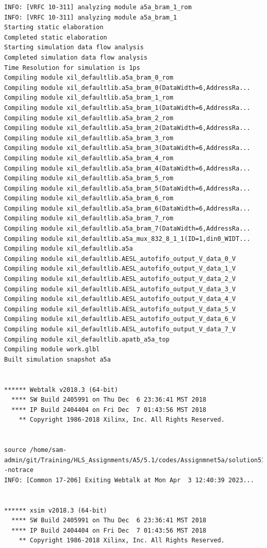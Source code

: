 \documentclass{article}
\begin{document}
\begin{lstlisting}
INFO: [VRFC 10-311] analyzing module a5a_bram_1_rom
INFO: [VRFC 10-311] analyzing module a5a_bram_1
Starting static elaboration
Completed static elaboration
Starting simulation data flow analysis
Completed simulation data flow analysis
Time Resolution for simulation is 1ps
Compiling module xil_defaultlib.a5a_bram_0_rom
Compiling module xil_defaultlib.a5a_bram_0(DataWidth=6,AddressRa...
Compiling module xil_defaultlib.a5a_bram_1_rom
Compiling module xil_defaultlib.a5a_bram_1(DataWidth=6,AddressRa...
Compiling module xil_defaultlib.a5a_bram_2_rom
Compiling module xil_defaultlib.a5a_bram_2(DataWidth=6,AddressRa...
Compiling module xil_defaultlib.a5a_bram_3_rom
Compiling module xil_defaultlib.a5a_bram_3(DataWidth=6,AddressRa...
Compiling module xil_defaultlib.a5a_bram_4_rom
Compiling module xil_defaultlib.a5a_bram_4(DataWidth=6,AddressRa...
Compiling module xil_defaultlib.a5a_bram_5_rom
Compiling module xil_defaultlib.a5a_bram_5(DataWidth=6,AddressRa...
Compiling module xil_defaultlib.a5a_bram_6_rom
Compiling module xil_defaultlib.a5a_bram_6(DataWidth=6,AddressRa...
Compiling module xil_defaultlib.a5a_bram_7_rom
Compiling module xil_defaultlib.a5a_bram_7(DataWidth=6,AddressRa...
Compiling module xil_defaultlib.a5a_mux_832_8_1_1(ID=1,din0_WIDT...
Compiling module xil_defaultlib.a5a
Compiling module xil_defaultlib.AESL_autofifo_output_V_data_0_V
Compiling module xil_defaultlib.AESL_autofifo_output_V_data_1_V
Compiling module xil_defaultlib.AESL_autofifo_output_V_data_2_V
Compiling module xil_defaultlib.AESL_autofifo_output_V_data_3_V
Compiling module xil_defaultlib.AESL_autofifo_output_V_data_4_V
Compiling module xil_defaultlib.AESL_autofifo_output_V_data_5_V
Compiling module xil_defaultlib.AESL_autofifo_output_V_data_6_V
Compiling module xil_defaultlib.AESL_autofifo_output_V_data_7_V
Compiling module xil_defaultlib.apatb_a5a_top
Compiling module work.glbl
Built simulation snapshot a5a


****** Webtalk v2018.3 (64-bit)
  **** SW Build 2405991 on Thu Dec  6 23:36:41 MST 2018
  **** IP Build 2404404 on Fri Dec  7 01:43:56 MST 2018
    ** Copyright 1986-2018 Xilinx, Inc. All Rights Reserved.


source /home/sam-admin/git/Training/HLS_Assignments/A5/5.1/codes/Assignmnet5a/solution51a/sim/verilog/xsim.dir/a5a/webtalk/xsim_webtalk.tcl -notrace
INFO: [Common 17-206] Exiting Webtalk at Mon Apr  3 12:40:39 2023...


****** xsim v2018.3 (64-bit)
  **** SW Build 2405991 on Thu Dec  6 23:36:41 MST 2018
  **** IP Build 2404404 on Fri Dec  7 01:43:56 MST 2018
    ** Copyright 1986-2018 Xilinx, Inc. All Rights Reserved.



\end{lstlisting}
\end{document}
